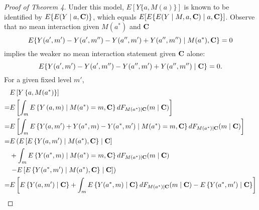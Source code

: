 \documentclass[12pt]{article}
\begin{document}
\begin{proof}[Proof of Theorem 4]
    Under this model, $E[Y\{a,M(a)\}]$ is known to be identified by $E\{E(Y\mid a,{\bf C})\}$, which equals $E[E\{E(Y\mid M,a,{\bf C})\mid a,{\bf C}\}]$. Observe that no mean interaction given $M(a^*)$ and $\bf C$
    \[E\{Y(a',m')-Y(a',m'')-Y(a'',m')+Y(a'',m'')\mid M(a^*),{\bf C}\}=0\]
    implies the weaker no mean interaction statement given $\bf C$ alone:
    \[E\{Y(a',m')-Y(a',m'')-Y(a'',m')+Y(a'',m'')\mid {\bf C}\}=0.\]
    For a given fixed level $m'$,
    \begin{align*}
        &E\left[Y\left\{a,M(a^*)\right\}\right]\\ 
        =&E\left[\int_m E\left\{Y\left(a,m\right)\mid M(a^*)=m, {\bf C}\right\}dF_{M(a^*)\mid{\bf C}}(m\mid {\bf C})\right]\\ 
        =&E\left[\int_m E\left\{Y(a,m')+Y(a^*,m)-Y(a^*,m')\mid M(a^*)=m, {\bf C}\right\}dF_{M(a^*)\mid{\bf C}}(m\mid {\bf C})\right]\\ 
        =&E\left(E\left[E\left\{Y(a,m')\mid M(a^*), {\bf C}\right\}\mid {\bf C}\right]\right.\\
        &+\int_m E\left\{Y(a^*,m)\mid M(a^*)=m, {\bf C}\right\}dF_{M(a^*)\mid{\bf C}}(m\mid {\bf C})\\
        &\left.-E\left[E\left\{Y(a^*,m')\mid M(a^*), {\bf C}\right\}\mid {\bf C}\right]\right)\\ 
        =&E\left[E\left\{Y(a,m')\mid {\bf C}\right\}+\int_m E\left\{Y(a^*,m)\mid {\bf C}\right\}dF_{M(a^*)\mid{\bf C}}(m\mid {\bf C})-E\left\{Y(a^*,m')\mid {\bf C}\right\}\right]\\ 

\end{align*}
\end{proof}
\end{document}

